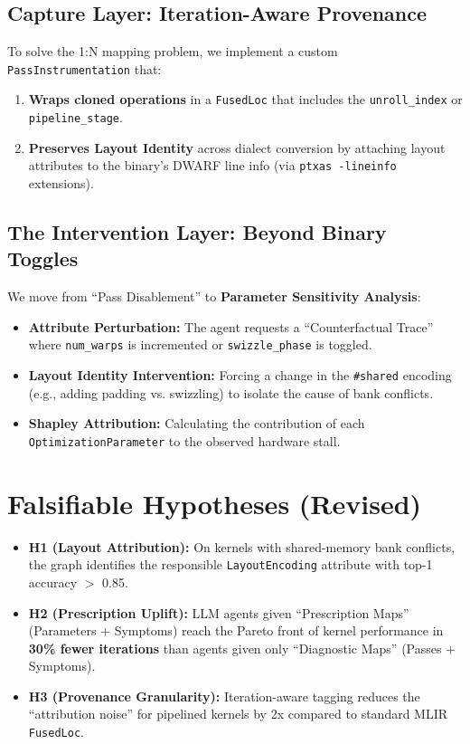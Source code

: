 \documentclass[11pt,a4paper]{article}
\begin{document}
\subsection{Capture Layer: Iteration-Aware Provenance}
To solve the 1:N mapping problem, we implement a custom \texttt{PassInstrumentation} that:
\begin{enumerate}
    \item \textbf{Wraps cloned operations} in a \texttt{FusedLoc} that includes the \texttt{unroll\_index} or \texttt{pipeline\_stage}.
    \item \textbf{Preserves Layout Identity} across dialect conversion by attaching layout attributes to the binary's DWARF line info (via \texttt{ptxas -lineinfo} extensions).
\end{enumerate}

\subsection{The Intervention Layer: Beyond Binary Toggles}
We move from ``Pass Disablement'' to \textbf{Parameter Sensitivity Analysis}:
\begin{itemize}
    \item \textbf{Attribute Perturbation:} The agent requests a ``Counterfactual Trace'' where \texttt{num\_warps} is incremented or \texttt{swizzle\_phase} is toggled.
    \item \textbf{Layout Identity Intervention:} Forcing a change in the \texttt{\#shared} encoding (e.g., adding padding vs. swizzling) to isolate the cause of bank conflicts.
    \item \textbf{Shapley Attribution:} Calculating the contribution of each \texttt{OptimizationParameter} to the observed hardware stall.
\end{itemize}

\section{Falsifiable Hypotheses (Revised)}
\begin{itemize}
    \item \textbf{H1 (Layout Attribution):} On kernels with shared-memory bank conflicts, the graph identifies the responsible \texttt{LayoutEncoding} attribute with top-1 accuracy $>$ 0.85.
    \item \textbf{H2 (Prescription Uplift):} LLM agents given ``Prescription Maps'' (Parameters + Symptoms) reach the Pareto front of kernel performance in \textbf{30\% fewer iterations} than agents given only ``Diagnostic Maps'' (Passes + Symptoms).
    \item \textbf{H3 (Provenance Granularity):} Iteration-aware tagging reduces the ``attribution noise'' for pipelined kernels by 2x compared to standard MLIR \texttt{FusedLoc}.
\end{itemize}
\end{document}
